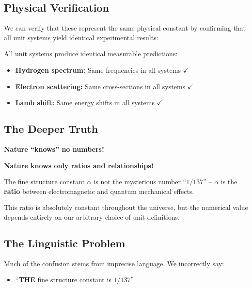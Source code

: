 \subsection{Physical Verification}

We can verify that these represent the same physical constant by confirming that all unit systems yield identical experimental results:

\begin{theorem}
	All unit systems produce identical measurable predictions:
	\begin{itemize}
		\item \textbf{Hydrogen spectrum:} Same frequencies in all systems $\checkmark$
		\item \textbf{Electron scattering:} Same cross-sections in all systems $\checkmark$
		\item \textbf{Lamb shift:} Same energy shifts in all systems $\checkmark$
	\end{itemize}
\end{theorem}

\subsection{The Deeper Truth}

\begin{tcolorbox}[colback=green!5!white,colframe=green!75!black,title=Nature's True Language]
	\textbf{Nature ``knows'' no numbers!}
	
	\textbf{Nature knows only ratios and relationships!}
\end{tcolorbox}

The fine structure constant $\alpha$ is not the mysterious number ``$1/137$'' -- $\alpha$ is the \textbf{ratio} between electromagnetic and quantum mechanical effects.

This ratio is absolutely constant throughout the universe, but the numerical value depends entirely on our arbitrary choice of unit definitions.

\subsection{The Linguistic Problem}

Much of the confusion stems from imprecise language. We incorrectly say:
\begin{itemize}
	\item[\textcolor{red}{$\times$}] ``\textbf{THE} fine structure constant is $1/137$''
\end{itemize}

